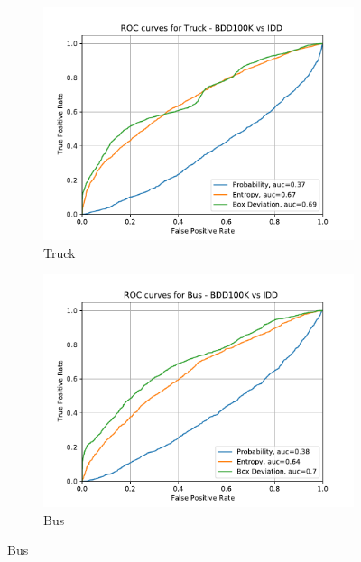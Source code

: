 \begin{figure}[H]
    	\begin{subfigure}[t]{0.495\textwidth}
    		\centering
    		\includegraphics[width=\textwidth]{images/ROC/truck_ROC_bdd_vs_idd_Score_using_bnn.pdf}
    		\caption{Truck}
    	\end{subfigure}
    	\begin{subfigure}[t]{0.495\textwidth}
    		\centering
    		\includegraphics[width=\textwidth]{images/ROC/bus_ROC_bdd_vs_idd_Score_using_bnn.pdf}
    		\caption{Bus}
    	\end{subfigure}
    	\end{figure}
        	
